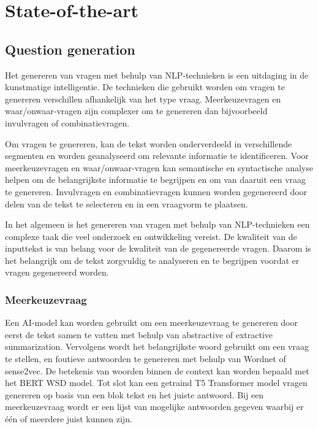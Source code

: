 




\section{State-of-the-art}
\label{sec:state-of-the-art}

\subsection{Question generation}
\label{sec:question-generation}
Het genereren van vragen met behulp van NLP-technieken is een uitdaging in de kunstmatige intelligentie. De technieken die gebruikt worden om vragen te genereren verschillen afhankelijk van het type vraag. Meerkeuzevragen en waar/onwaar-vragen zijn complexer om te genereren dan bijvoorbeeld invulvragen of combinatievragen.

Om vragen te genereren, kan de tekst worden onderverdeeld in verschillende segmenten en worden geanalyseerd om relevante informatie te identificeren. Voor meerkeuzevragen en waar/onwaar-vragen kan semantische en syntactische analyse helpen om de belangrijkste informatie te begrijpen en om van daaruit een vraag te genereren. Invulvragen en combinatievragen kunnen worden gegenereerd door delen van de tekst te selecteren en in een vraagvorm te plaatsen.

In het algemeen is het genereren van vragen met behulp van NLP-technieken een complexe taak die veel onderzoek en ontwikkeling vereist. De kwaliteit van de inputtekst is van belang voor de kwaliteit van de gegenereerde vragen. Daarom is het belangrijk om de tekst zorgvuldig te analyseren en te begrijpen voordat er vragen gegenereerd worden.

\subsubsection{Meerkeuzevraag}
\label{sec:meerkeuzevraag}
Een AI-model kan worden gebruikt om een meerkeuzevraag te genereren door eerst de tekst samen te vatten met behulp van abstractive of extractive summarization. Vervolgens wordt het belangrijkste woord gebruikt om een vraag te stellen, en foutieve antwoorden te genereren met behulp van Wordnet of sense2vec. De betekenis van woorden binnen de context kan worden bepaald met het BERT WSD model. Tot slot kan een getraind T5 Transformer model vragen genereren op basis van een blok tekst en het juiste antwoord. Bij een meerkeuzevraag wordt er een lijst van mogelijke antwoorden gegeven waarbij er één of meerdere juist kunnen zijn.\autocite{AIEngineering2021}

